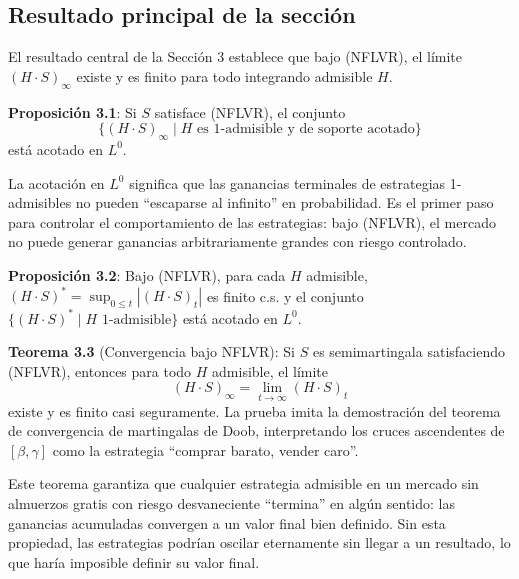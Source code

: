 \documentclass[12pt]{article}
\begin{document}
\subsection{Resultado principal de la secci\'on}

El resultado central de la Secci\'on 3 establece que bajo (NFLVR), el l\'imite $(H \cdot S)_\infty$ existe y es finito para todo integrando admisible $H$.

\textbf{Proposici\'on 3.1}: Si $S$ satisface (NFLVR), el conjunto
\begin{equation}
    \{(H \cdot S)_\infty \mid H \text{ es 1-admisible y de soporte acotado}\}
\end{equation}
est\'a acotado en $L^0$.

\begin{intuicionmat}
La acotaci\'on en $L^0$ significa que las ganancias terminales de estrategias 1-admisibles no pueden ``escaparse al infinito'' en probabilidad. Es el primer paso para controlar el comportamiento de las estrategias: bajo (NFLVR), el mercado no puede generar ganancias arbitrariamente grandes con riesgo controlado.
\end{intuicionmat}

\textbf{Proposici\'on 3.2}: Bajo (NFLVR), para cada $H$ admisible, $(H \cdot S)^* = \sup_{0 \leq t} |(H \cdot S)_t|$ es finito c.s. y el conjunto $\{(H \cdot S)^* \mid H \text{ 1-admisible}\}$ est\'a acotado en $L^0$.

\textbf{Teorema 3.3} (Convergencia bajo NFLVR): Si $S$ es semimartingala satisfaciendo (NFLVR), entonces para todo $H$ admisible, el l\'imite
\begin{equation}
    (H \cdot S)_\infty = \lim_{t \to \infty} (H \cdot S)_t
\end{equation}
existe y es finito casi seguramente. La prueba imita la demostraci\'on del teorema de convergencia de martingalas de Doob, interpretando los cruces ascendentes de $[\beta, \gamma]$ como la estrategia ``comprar barato, vender caro''.

\begin{intuicionmat}
Este teorema garantiza que cualquier estrategia admisible en un mercado sin almuerzos gratis con riesgo desvaneciente ``termina'' en alg\'un sentido: las ganancias acumuladas convergen a un valor final bien definido. Sin esta propiedad, las estrategias podr\'ian oscilar eternamente sin llegar a un resultado, lo que har\'ia imposible definir su valor final.
\end{intuicionmat}
\end{document}
